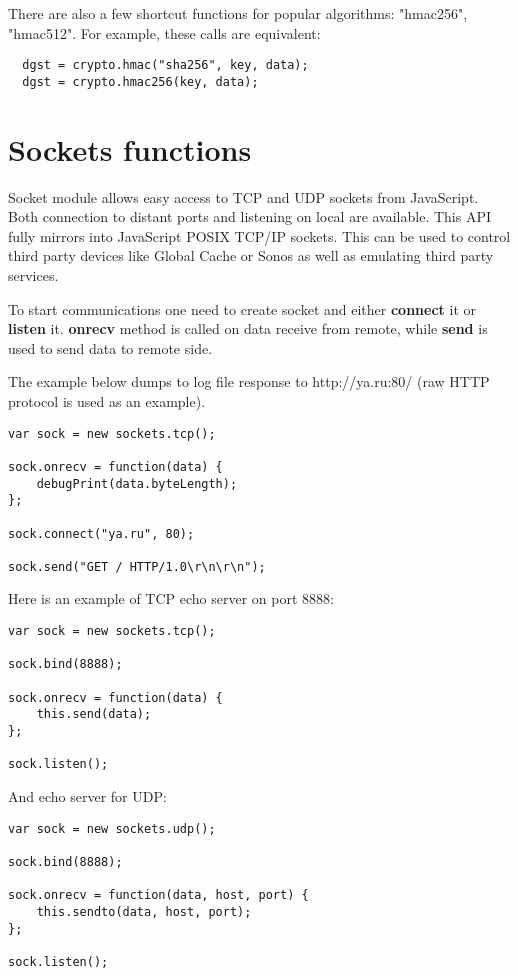 There are also a few shortcut functions for popular algorithms: "hmac256", "hmac512". For example, these calls are equivalent:

\begin{lstlisting}
  dgst = crypto.hmac("sha256", key, data);
  dgst = crypto.hmac256(key, data);
\end{lstlisting}

\section{Sockets functions}

Socket module allows easy access to TCP and UDP sockets from JavaScript.
Both connection to distant ports and listening on local are available. This API fully mirrors into JavaScript POSIX TCP/IP sockets.
This can be used to control third party devices like Global Cache or Sonos
as well as emulating third party services.

To start communications one need to create socket and either
\textbf{connect} it or \textbf{listen} it. \textbf{onrecv} method is called
on data receive from remote, while \textbf{send} is used to send data to remote side.

The example below dumps to log file response to http://ya.ru:80/ (raw HTTP
protocol is used as an example).

\begin{lstlisting}
var sock = new sockets.tcp();

sock.onrecv = function(data) {
    debugPrint(data.byteLength);
};

sock.connect("ya.ru", 80);

sock.send("GET / HTTP/1.0\r\n\r\n");
\end{lstlisting}

Here is an example of TCP echo server on port 8888:

\begin{lstlisting}
var sock = new sockets.tcp();

sock.bind(8888);

sock.onrecv = function(data) {
    this.send(data);
};

sock.listen();
\end{lstlisting}

And echo server for UDP:
\begin{lstlisting}
var sock = new sockets.udp();

sock.bind(8888);

sock.onrecv = function(data, host, port) {
    this.sendto(data, host, port);
};

sock.listen();
\end{lstlisting}

